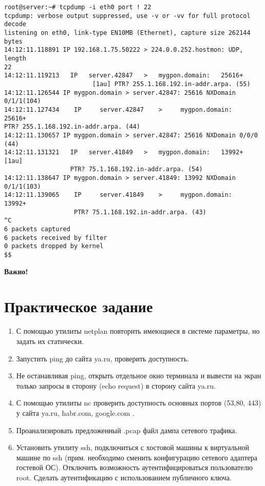 \documentclass[14pt, a4paper]{article}
\begin{document}
\vspace{0.3cm}
\begin{lstlisting}
root@server:~# tcpdump -i eth0 port ! 22
tcpdump: verbose output suppressed, use -v or -vv for full protocol decode
listening on eth0, link-type EN10MB (Ethernet), capture size 262144 bytes
14:12:11.118891 IP 192.168.1.75.50222 > 224.0.0.252.hostmon: UDP, length
22
14:12:11.119213   IP   server.42847   >   mygpon.domain:   25616+
                        [1au] PTR? 255.1.168.192.in-addr.arpa. (55)
14:12:11.126544 IP mygpon.domain > server.42847: 25616 NXDomain 0/1/1(104)
14:12:11.127434    IP     server.42847    >     mygpon.domain:    25616+
PTR? 255.1.168.192.in-addr.arpa. (44)
14:12:11.130657 IP mygpon.domain > server.42847: 25616 NXDomain 0/0/0 (44)
14:12:11.131321   IP   server.41849   >   mygpon.domain:   13992+   [1au]
                  PTR? 75.1.168.192.in-addr.arpa. (54)
14:12:11.138647 IP mygpon.domain > server.41849: 13992 NXDomain 0/1/1(103)
14:12:11.139065    IP     server.41849    >     mygpon.domain:    13992+
                   PTR? 75.1.168.192.in-addr.arpa. (43)
^C
6 packets captured
6 packets received by filter
0 packets dropped by kernel
$$
\end{lstlisting}
\vspace{0.2cm}

\textbf{Важно!} \\

\newpage

\section*{Практическое задание} 

\begin{enumerate}
    \item С помощью утилиты netplan повторить имеющиеся в системе параметры, но задать их
    статически.
    \item Запустить ping до сайта ya.ru, проверить доступность.
    \item Не останавливая ping, открыть отдельное окно терминала и вывести на экран только запросы
    в сторону (echo request) в сторону сайта ya.ru.
    \item С помощью утилиты nc проверить доступность основных портов (53,80, 443) у сайта
    ya.ru, habr.com, google.com .
    \item Проанализировать предложенный .pcap файл дампа сетевого трафика.
    \item Установить утилиту ssh, подключиться с хостовой машины к виртуальной машине по ssh
    (прим. необходимо сменить конфигурацию сетевого адаптера гостевой ОС). Отключить
    возможность аутентифицироваться пользователю root. Сделать аутентификацию с
    использованием публичного ключа.
\end{enumerate}
\end{document}
